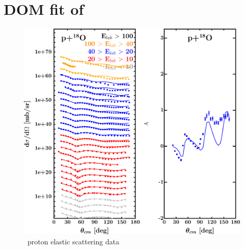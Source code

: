 \section{DOM fit of \oEight}
\label{o18DOMOutput}
\begin{figure}[H]
    \centering
    \begin{minipage}{0.45\textwidth}
        \centering
        \includegraphics[width=1.0\textwidth]{figures/o18_protonElastic.png}
        \caption{\oEight\ proton elastic scattering data}
        \label{DOMFitData_o18_proton_elastic}
    \end{minipage}\hfill
    \begin{minipage}{0.45\textwidth}
        \centering

\end{minipage}
\end{figure}
